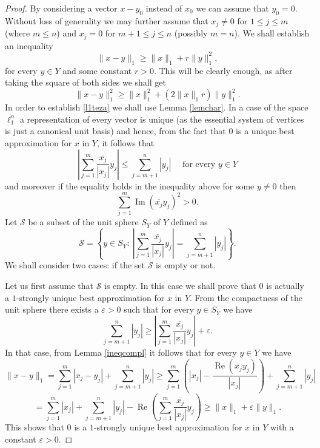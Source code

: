 \documentclass[12pt, reqno]{amsart}
\theoremstyle{definition}
\theoremstyle{remark}
\numberwithin{equation}{section}
\DeclareMathOperator{\re}{Re}
\DeclareMathOperator{\im}{Im}
\begin{document}
\begin{proof}

By considering a vector $x - y_0$ instead of $x_0$ we can assume that $y_0=0$. Without loss of generality we may further assume that $x_j \neq 0$ for $1 \leq j \leq m$ (where $m \leq n$) and $x_j=0$ for $m+1 \leq j \leq n$ (possibly $m=n$). We shall establish an inequality
\begin{equation}
\label{l1teza}
\|x-y\|_1 \geq \|x\|_1 + r\|y\|^2_1,
\end{equation}
for every $y \in Y$ and some constant $r>0$. This will be clearly enough, as after taking the square of both sides we shall get
$$\|x-y\|_1^2 \geq \|x\|_1^2 + (2\|x\|_1r)\|y\|^2_1.$$
In order to establish \eqref{l1teza} we shall use Lemma \ref{lemchar}. In a case of the space $\ell_1^n$ a representation of every vector is unique (as the essential system of vertices is just a canonical unit basis) and hence, from the fact that $0$ is a unique best approximation for $x$ in $Y$, it follows that
$$\left | \sum_{j=1}^{m} \frac{\overline{x_j}}{|x_j|} y_j \right | \leq \sum_{j=m+1}^{n} |y_j| \quad \text{ for every } y \in Y$$
and moreover if the equality holds in the inequality above for some $y \neq 0$ then
$$\sum_{j=1}^{m} \im(\overline{x_j}y_j)^2 > 0.$$
Let $\mathcal{S}$ be a subset of the unit sphere $S_Y$ of $Y$ defined as
$$\mathcal{S} = \left \{ y \in S_Y: \  \left | \sum_{j=1}^{m} \frac{\overline{x_j}}{|x_j|} y_j \right | = \sum_{j=m+1}^{n} |y_j| \right \}.$$
We shall consider two cases: if the set $\mathcal{S}$ is empty or not.

Let us first assume that $\mathcal{S}$ is empty. In this case we shall prove that $0$ is actually a $1$-strongly unique best approximation for $x$ in $Y$. From the compactness of the unit sphere there exists a $\varepsilon>0$ such that for every $y \in S_Y$ we have
$$\sum_{j=m+1}^{n} |y_j| \geq \left | \sum_{j=1}^{m} \frac{\overline{x_j}}{|x_j|} y_j \right | + \varepsilon.$$
In that case, from Lemma \eqref{ineqcompl} it follows that for every $y \in Y$ we have
$$\|x-y\|_1 = \sum_{j=1}^{m} |x_j-y_j| + \sum_{j=m+1}^{n} |y_j| \geq \sum_{j=1}^{m} \left ( |x_j| - \frac{\re(\overline{x_j}y_j)}{|x_j|} \right ) + \sum_{j=m+1}^{n} |y_j| $$
$$= \sum_{j=1}^{m} |x_j| + \sum_{j=m+1}^{n} |y_j| - \re \left (\sum_{j=1}^{m} \frac{\overline{x_j}}{|x_j|}y_j \right )\geq \|x\|_1 + \varepsilon \|y\|_1.$$
This shows that $0$ is a $1$-strongly unique best approximation for $x$ in $Y$ with a constant $\varepsilon>0$.


\end{proof}
\end{document}
